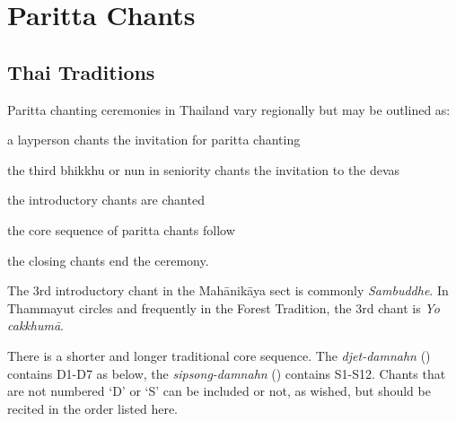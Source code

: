\chapter{Paritta Chants}

\section{Thai Traditions}

Paritta chanting ceremonies in Thailand vary regionally but may be outlined as:

\begin{packeditemize}
  \item a layperson chants the invitation for paritta chanting
  \item the third bhikkhu or nun in seniority chants the invitation to the devas
  \item the introductory chants are chanted
  \item the core sequence of paritta chants follow
  \item the closing chants end the ceremony.
\end{packeditemize}

The 3rd introductory chant in the Mahānikāya sect is commonly \emph{Sambuddhe}.
In Thammayut circles and frequently in the Forest Tradition, the 3rd chant is
\emph{Yo cakkhumā}.

There is a shorter and longer traditional core sequence. The \emph{djet-damnahn}
() contains D1-D7 as below, the \emph{sipsong-damnahn}
() contains S1-S12. Chants that are not numbered `D' or `S' can
be included or not, as wished, but should be recited in the order listed here.

\clearpage

